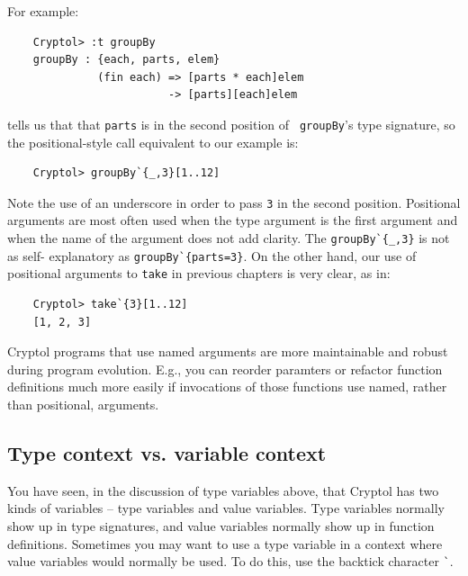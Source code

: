 For example:
\begin{Verbatim}
    Cryptol> :t groupBy
    groupBy : {each, parts, elem} 
              (fin each) => [parts * each]elem 
                         -> [parts][each]elem
\end{Verbatim}
tells us that that {\tt parts} is in the second position of {\tt
  groupBy}'s type signature, so the positional-style call equivalent
to our example is:
\begin{Verbatim}
    Cryptol> groupBy`{_,3}[1..12]
\end{Verbatim}

Note the use of an underscore in order to pass \texttt{3} in the
second position.  Positional arguments are most often used when the
type argument is the first argument and when the name of the argument
does not add clarity.  The {\tt groupBy\Verb|`{_,3}|} is not as self-
explanatory as {\tt groupBy\Verb|`{parts=3}|}.  On the other hand, our
use of positional arguments to {\tt take} in previous chapters is very
clear, as in:
\begin{Verbatim}
    Cryptol> take`{3}[1..12]
    [1, 2, 3]
\end{Verbatim}

\begin{tip}
  Cryptol programs that use named arguments are more maintainable and
  robust during program evolution.  E.g., you can reorder paramters or
  refactor function definitions much more easily if invocations of
  those functions use named, rather than positional, arguments.
\end{tip}


\subsection{Type context vs. variable context}\indTypeContext
\label{sec:type-context-vs}

You have seen, in the discussion of type variables above, that Cryptol
has two kinds of variables -- type variables and value variables. Type
variables normally show up in type signatures, and value variables
normally show up in function definitions. Sometimes you may want to
use a type variable in a context where value variables would normally
be used.  To do this, use the backtick character {\tt \Verb|`|}.  

